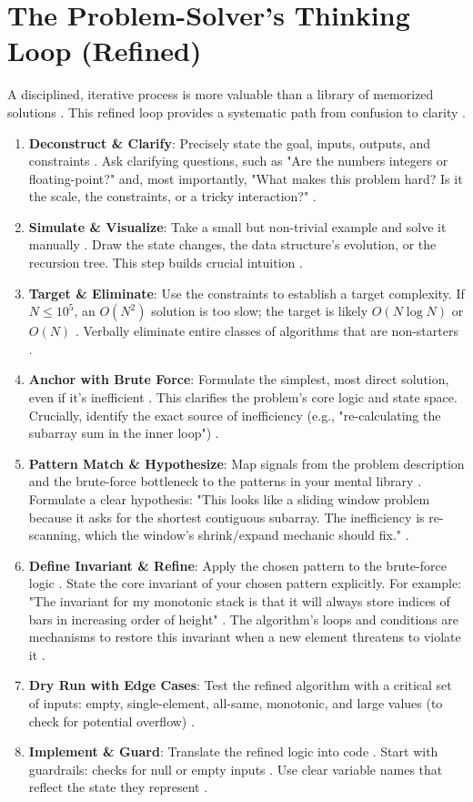 \documentclass{article}
\begin{document}
\section{The Problem-Solver's Thinking Loop (Refined)}
A disciplined, iterative process is more valuable than a library of memorized solutions \cite{36}. This refined loop provides a systematic path from confusion to clarity \cite{37}.
\begin{enumerate}
\item \textbf{Deconstruct \& Clarify}: Precisely state the goal, inputs, outputs, and constraints \cite{38}. Ask clarifying questions, such as "Are the numbers integers or floating-point?" and, most importantly, "What makes this problem hard? Is it the scale, the constraints, or a tricky interaction?" \cite{39, 40}.
\item \textbf{Simulate \& Visualize}: Take a small but non-trivial example and solve it manually \cite{41}. Draw the state changes, the data structure's evolution, or the recursion tree. This step builds crucial intuition \cite{42}.
\item \textbf{Target \& Eliminate}: Use the constraints to establish a target complexity. If $N\le10^5$, an $O(N^2)$ solution is too slow; the target is likely $O(N\log N)$ or $O(N)$ \cite{43, 44}. Verbally eliminate entire classes of algorithms that are non-starters \cite{44}.
\item \textbf{Anchor with Brute Force}: Formulate the simplest, most direct solution, even if it's inefficient \cite{45}. This clarifies the problem's core logic and state space. Crucially, identify the exact source of inefficiency (e.g., "re-calculating the subarray sum in the inner loop") \cite{46}.
\item \textbf{Pattern Match \& Hypothesize}: Map signals from the problem description and the brute-force bottleneck to the patterns in your mental library \cite{47}. Formulate a clear hypothesis: "This looks like a sliding window problem because it asks for the shortest contiguous subarray. The inefficiency is re-scanning, which the window's shrink/expand mechanic should fix." \cite{48}.
\item \textbf{Define Invariant \& Refine}: Apply the chosen pattern to the brute-force logic \cite{49}. State the core invariant of your chosen pattern explicitly. For example: "The invariant for my monotonic stack is that it will always store indices of bars in increasing order of height" \cite{50}. The algorithm's loops and conditions are mechanisms to restore this invariant when a new element threatens to violate it \cite{51}.
\item \textbf{Dry Run with Edge Cases}: Test the refined algorithm with a critical set of inputs: empty, single-element, all-same, monotonic, and large values (to check for potential overflow) \cite{52}.
\item \textbf{Implement \& Guard}: Translate the refined logic into code \cite{53}. Start with guardrails: checks for null or empty inputs \cite{53}. Use clear variable names that reflect the state they represent \cite{54}.
\end{enumerate}
\end{document}
